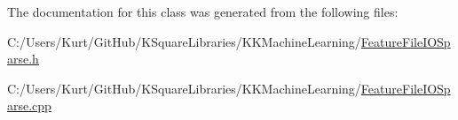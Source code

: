 The documentation for this class was generated from the following files\+:\begin{DoxyCompactItemize}
\item 
C\+:/\+Users/\+Kurt/\+Git\+Hub/\+K\+Square\+Libraries/\+K\+K\+Machine\+Learning/\hyperlink{_feature_file_i_o_sparse_8h}{Feature\+File\+I\+O\+Sparse.\+h}\item 
C\+:/\+Users/\+Kurt/\+Git\+Hub/\+K\+Square\+Libraries/\+K\+K\+Machine\+Learning/\hyperlink{_feature_file_i_o_sparse_8cpp}{Feature\+File\+I\+O\+Sparse.\+cpp}\end{DoxyCompactItemize}
